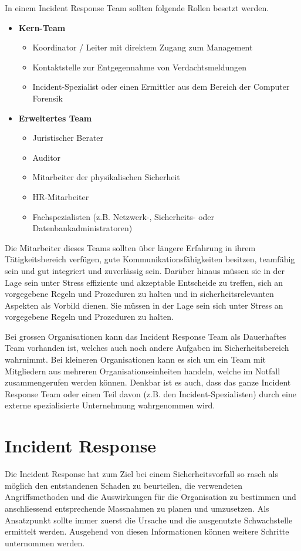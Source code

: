 In einem Incident Response Team sollten folgende Rollen besetzt werden.

\begin{itemize}
\item \textbf{Kern-Team} \\
\begin{itemize}
\item Koordinator / Leiter mit direktem Zugang zum Management
\item Kontaktstelle zur Entgegennahme von Verdachtsmeldungen
\item Incident-Spezialist oder einen Ermittler aus dem Bereich der Computer Forensik
\end{itemize}
\item \textbf{Erweitertes Team} \\
\begin{itemize}
\item Juristischer Berater
\item Auditor
\item Mitarbeiter der physikalischen Sicherheit
\item HR-Mitarbeiter
\item Fachspezialisten (z.B. Netzwerk-, Sicherheits- oder Datenbankadministratoren)
\end{itemize}
\end{itemize}

Die Mitarbeiter dieses Teams sollten über längere Erfahrung in ihrem Tätigkeitsbereich verfügen, gute Kommunikationsfähigkeiten besitzen, teamfähig sein und gut integriert und zuverlässig sein. Darüber hinaus müssen sie in der Lage sein unter Stress effiziente und akzeptable Entscheide zu treffen, sich an vorgegebene Regeln und Prozeduren zu halten und in sicherheitsrelevanten Aspekten als Vorbild dienen. Sie müssen in der Lage sein sich unter Stress an vorgegebene Regeln und Prozeduren zu halten.

Bei grossen Organisationen kann das Incident Response Team als Dauerhaftes Team vorhanden ist, welches auch noch andere Aufgaben im Sicherheitsbereich wahrnimmt. Bei kleineren Organisationen kann es sich um ein Team mit Mitgliedern aus mehreren Organisationseinheiten handeln, welche im Notfall zusammengerufen werden können. Denkbar ist es auch, dass das ganze Incident Response Team oder einen Teil davon (z.B. den Incident-Spezialisten) durch eine externe spezialisierte Unternehmung wahrgenommen wird.


\section{Incident Response}
Die Incident Response hat zum Ziel bei einem Sicherheitsvorfall so rasch als möglich den entstandenen Schaden zu beurteilen, die verwendeten Angriffsmethoden und die Auswirkungen für die Organisation zu bestimmen und anschliessend entsprechende Massnahmen zu planen und umzusetzen. Als Ansatzpunkt sollte immer zuerst die Ursache und die ausgenutzte Schwachstelle ermittelt werden. Ausgehend von diesen Informationen können weitere Schritte unternommen werden.

